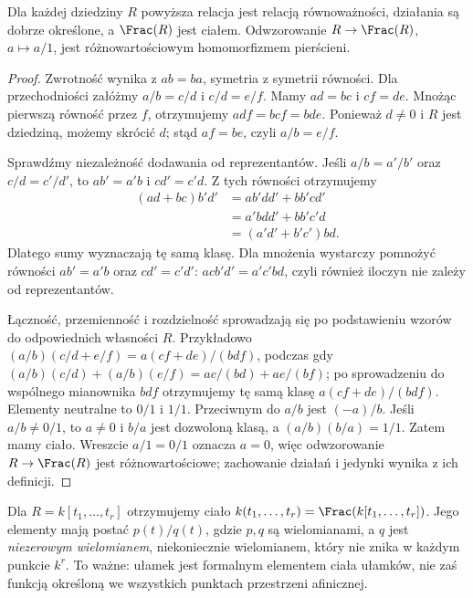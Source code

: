\begin{lemat}
\label{lem:frac-construction}
Dla każdej dziedziny $R$ powyższa relacja jest relacją
równoważności, działania są dobrze określone, a $\Frac(R)$
jest ciałem. Odwzorowanie $R\to\Frac(R)$,
$a\mapsto a/1$, jest różnowartościowym homomorfizmem pierścieni.
\end{lemat}
\begin{proof}
Zwrotność wynika z $ab=ba$, symetria z symetrii równości.
Dla przechodniości załóżmy $a/b=c/d$ i $c/d=e/f$.
Mamy $ad=bc$ i $cf=de$. Mnożąc pierwszą równość przez
$f$, otrzymujemy $adf=bcf=bde$. Ponieważ $d\ne0$
i $R$ jest dziedziną, możemy skrócić $d$; stąd $af=be$,
czyli $a/b=e/f$.

Sprawdźmy niezależność dodawania od reprezentantów.
Jeśli $a/b=a'/b'$ oraz $c/d=c'/d'$, to
$ab'=a'b$ i $cd'=c'd$. Z tych równości otrzymujemy
\begin{align*}
(ad+bc)b'd'
 &=ab'dd'+bb'cd'\\
 &=a'bdd'+bb'c'd\\
 &=(a'd'+b'c')bd.
\end{align*}
Dlatego sumy wyznaczają tę samą klasę. Dla mnożenia
wystarczy pomnożyć równości $ab'=a'b$ oraz $cd'=c'd'$:
$acb'd'=a'c'bd$, czyli również iloczyn nie zależy od
reprezentantów.

Łączność, przemienność i rozdzielność sprowadzają się
po podstawieniu wzorów do odpowiednich własności $R$.
Przykładowo $(a/b)(c/d+e/f)=a(cf+de)/(bdf)$,
podczas gdy $(a/b)(c/d)+(a/b)(e/f)=ac/(bd)+ae/(bf)$;
po sprowadzeniu do wspólnego mianownika $bdf$ otrzymujemy
tę samą klasę $a(cf+de)/(bdf)$.
Elementy neutralne to $0/1$ i $1/1$.
Przeciwnym do $a/b$ jest $(-a)/b$.
Jeśli $a/b\ne0/1$, to $a\ne0$ i $b/a$ jest dozwoloną klasą,
a $(a/b)(b/a)=1/1$. Zatem mamy ciało.
Wreszcie $a/1=0/1$ oznacza $a=0$, więc odwzorowanie
$R\to\Frac(R)$ jest różnowartościowe; zachowanie działań
i jedynki wynika z ich definicji.
\end{proof}

\begin{uwaga}
Dla $R=k[t_1,\dots,t_r]$ otrzymujemy ciało
$k(t_1,\dots,t_r)=\Frac(k[t_1,\dots,t_r])$.
Jego elementy mają postać $p(t)/q(t)$, gdzie $p,q$ są
wielomianami, a $q$ jest \emph{niezerowym wielomianem},
niekoniecznie wielomianem, który nie znika w każdym punkcie $k^r$.
To ważne: ułamek jest formalnym elementem ciała ułamków,
nie zaś funkcją określoną we wszystkich punktach przestrzeni afinicznej.
\end{uwaga}

